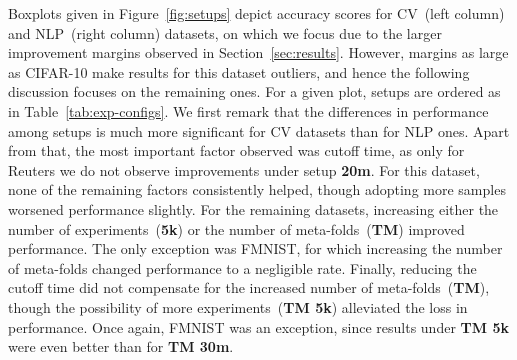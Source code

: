 Boxplots given in Figure~\ref{fig:setups} depict accuracy scores for CV~(left column) and NLP~(right column) datasets, on which we focus due to the larger improvement margins observed in Section~\ref{sec:results}. However, margins as large as CIFAR-10 make results for this dataset outliers, and hence the following discussion focuses on the remaining ones. For a given plot, setups are ordered as in Table~\ref{tab:exp-configs}. We first remark that the differences in performance among setups is much more significant for CV datasets than for NLP ones. Apart from that, the most important factor observed was cutoff time, as only for Reuters we do not observe improvements under setup \textbf{20m}. For this dataset, none of the remaining factors consistently helped, though adopting more samples worsened performance slightly. For the remaining datasets, increasing either the number of experiments~(\textbf{5k}) or the number of meta-folds~(\textbf{TM}) improved performance. The only exception was FMNIST, for which increasing the number of meta-folds changed performance to a negligible rate. Finally, reducing the cutoff time did not compensate for the increased number of meta-folds~(\textbf{TM}), though the possibility of more experiments~(\textbf{TM 5k}) alleviated the loss in performance. Once again, FMNIST was an exception, since results under \textbf{TM 5k} were even better than for \textbf{TM 30m}.


